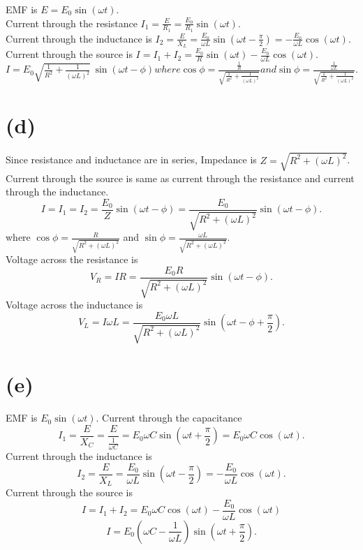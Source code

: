 \documentclass[12pt]{article}
\begin{document}
EMF is \(E=E_0\sin{(\omega{t})}.\)\\
Current through the resistance \(I_1=\frac{E}{R_1}=\frac{E_0}{R_1}\sin{(\omega{t})}.\)\\
Current through the inductance is \(I_2=\frac{E}{X_L}=\frac{E_0}{\omega{L}}\sin{\left(\omega{t}-\frac{\pi}{2}\right)}=-\frac{E_0}{\omega{L}}\cos{\left(\omega{t}\right)}.\)\\
Current through the source is \(I=I_1+I_2=\frac{E_0}{R}\sin{\left(\omega{t}\right)}-\frac{E_0}{\omega{L}}\cos{\left(\omega{t}\right)}.\)\\
\(I=E_0\sqrt{\frac{1}{R^2}+\frac{1}{(\omega{L})^2}}\,\sin{\left(\omega{t}-\phi\right)} where \cos{\phi}=\frac{\frac{1}{R}}{\sqrt{\frac{1}{R^2}+\frac{1}{(\omega{L})^2}}} and \sin{\phi}=\frac{\frac{1}{\omega{L}}}{\sqrt{\frac{1}{R^2}+\frac{1}{(\omega{L})^2}}}.\)\\
\section*{(d)}
Since resistance and inductance are in series, Impedance is \(Z=\sqrt{R^2+(\omega{L})^2}\).\\
Current through the source is same as current through the resistance and current through the inductance.\\
\[I=I_1=I_2=\frac{E_0}{Z}\sin{\left(\omega{t}-\phi \right )}=\frac{E_0}{\sqrt{R^2+(\omega{L})^2}}\sin{\left(\omega{t}-\phi \right )}.\]
where \(\cos{\phi}=\frac{R}{\sqrt{R^2+(\omega{L})^2}}\) and \(\sin{\phi}=\frac{\omega{L}}{\sqrt{R^2+(\omega{L})^2}}.\)\\
Voltage across the resistance is \[V_{R}=IR=\frac{E_0R}{\sqrt{R^2+(\omega{L})^2}}\sin{\left(\omega{t}-\phi \right )}.\]
Voltage across the inductance is \[V_{L}=I\omega{L}=\frac{E_0\omega{L}}{\sqrt{R^2+(\omega{L})^2}}\sin{\left(\omega{t}-\phi +\frac{\pi}{2}\right )}.\]
\section*{(e)}
EMF is \(E_0\sin{(\omega{t})}.\) Current through the capacitance 
\[I_1=\frac{E}{X_C}=\frac{E}{\frac{1}{\omega{C}}}=E_0\omega{C}\sin{\left(\omega{t}+\frac{\pi}{2}\right)}=E_0\omega{C}\cos{\left(\omega{t}\right)}.\]
Current through the inductance is \[I_2=\frac{E}{X_L}=\frac{E_0}{\omega{L}}\sin{\left(\omega{t}-\frac{\pi}{2}\right)}=-\frac{E_0}{\omega{L}}\cos{\left(\omega{t}\right)}.\]
Current through the source is 
\[I=I_1+I_2=E_0\omega{C}\cos{\left(\omega{t}\right)}-\frac{E_0}{\omega{L}}\cos{\left(\omega{t}\right)}\]
\[I=E_0\left(\omega{C}-\frac{1}{\omega{L}} \right )\sin{\left(\omega{t}+\frac{\pi}{2}\right)}. \]
\end{document}
